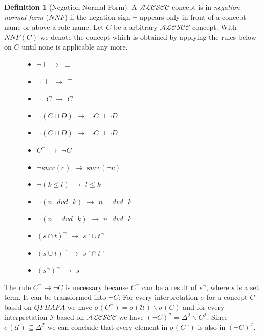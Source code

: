\documentclass{book}
\theoremstyle{break}
\theoremstyle{definition}
\newtheorem{mydef}{Definition}
\begin{document}
\begin{mydef}[Negation Normal Form]
A $\mathcal{ALCSCC}$ concept is in \textit{negation normal form} ($NNF$) if the negation sign $\neg$ appears only in front of a concept name or above a role name. Let $C$ be a arbitrary $\mathcal{ALCSCC}$ concept. With $NNF(C)$ we denote the concept which is obtained by applying the rules below on $C$ until none is applicable any more.
\begin{figure}[H]
\begin{minipage}[t]{.5\textwidth}
\raggedright
\begin{itemize}
\item $\neg\top$ $\rightarrow$ $\perp$
\item $\neg\perp$ $\rightarrow$ $\top$
\item $\neg\neg C$ $\rightarrow$ $C$
\item $\neg(C\sqcap D)$ $\rightarrow$ $\neg C \sqcup \neg D$
\item $\neg(C\sqcup D)$ $\rightarrow$ $\neg C \sqcap \neg D$
\item $C^\neg$ $\rightarrow$ $\neg C$
\item $\neg succ(c)$ $\rightarrow$ $succ(\neg c)$
\end{itemize}
\end{minipage}%
\begin{minipage}[t]{.5\textwidth}
\raggedleft
\begin{itemize}
\item $\neg (k\leq l)$ $\rightarrow$ $l\leq k$
\item $\neg (n\text{ } dvd \text{ } k)$ $\rightarrow$ $n\text{ } \neg dvd \text{ } k$
\item $\neg (n\text{ } \neg dvd \text{ } k)$ $\rightarrow$ $n\text{ } dvd \text{ } k$
\item $(s\cap t)^\neg$ $\rightarrow$ $s^\neg \cup t^\neg$
\item $(s\cup t)^\neg$ $\rightarrow$ $s^\neg \cap t^\neg$
\item $(s^\neg)^\neg$ $\rightarrow$ $s$
\end{itemize}
\end{minipage}
\end{figure}
\end{mydef}
The rule $C^\neg\rightarrow \neg C$ is necessary because $C^\neg$ can be a result of $s^\neg$, where $s$ is a set term. It can be transformed into $\neg C$: For every interpretation $\sigma$ for a concept $C$ based on $QFBAPA$ we have $\sigma(C^\neg)=\sigma(\mathcal{U})\backslash \sigma(C)$ and for every interpretation $\mathcal{I}$ based on $\mathcal{ALCSCC}$ we have $(\neg C)^\mathcal{I}=\Delta^\mathcal{I}\backslash C^\mathcal{I}$. Since $\sigma(\mathcal{U})\subseteq \Delta^\mathcal{I}$ we can conclude that every element in $\sigma(C^\neg)$ is also in $(\neg C)^\mathcal{I}$.\\
\end{document}
